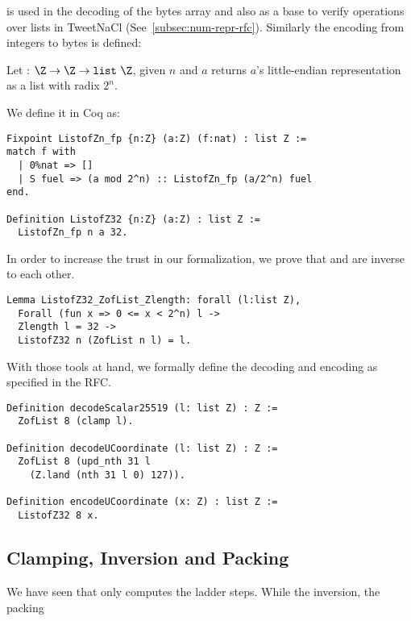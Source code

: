  is used in the decoding of the bytes array and also as a
base to verify operations over lists in TweetNaCl (See~\ref{subsec:num-repr-rfc}).
Similarly the encoding from integers to bytes is defined:
\begin{dfn}
Let  : $\Z \rightarrow \Z \rightarrow \texttt{list}~\Z$, given
$n$ and $a$ returns $a$'s little-endian representation
as a list with radix $2^n$.
\end{dfn}
We define it in Coq as:
\begin{lstlisting}[language=Coq]
Fixpoint ListofZn_fp {n:Z} (a:Z) (f:nat) : list Z :=
match f with
  | 0%nat => []
  | S fuel => (a mod 2^n) :: ListofZn_fp (a/2^n) fuel
end.

Definition ListofZ32 {n:Z} (a:Z) : list Z :=
  ListofZn_fp n a 32.
\end{lstlisting}
In order to increase the trust in our formalization, we prove that
 and  are inverse to each other.

\begin{lstlisting}[language=Coq]
Lemma ListofZ32_ZofList_Zlength: forall (l:list Z),
  Forall (fun x => 0 <= x < 2^n) l ->
  Zlength l = 32 ->
  ListofZ32 n (ZofList n l) = l.
\end{lstlisting}

With those tools at hand, we formally define the decoding and encoding as specified in the RFC.

\begin{lstlisting}[language=Coq]
Definition decodeScalar25519 (l: list Z) : Z :=
  ZofList 8 (clamp l).

Definition decodeUCoordinate (l: list Z) : Z :=
  ZofList 8 (upd_nth 31 l
    (Z.land (nth 31 l 0) 127)).

Definition encodeUCoordinate (x: Z) : list Z :=
  ListofZ32 8 x.
\end{lstlisting}

\subsection{Clamping, Inversion and Packing}
\label{subsec:spec-unpack-clamp-inv-pack}

We have seen that  only computes the ladder steps.
While the inversion, the packing

